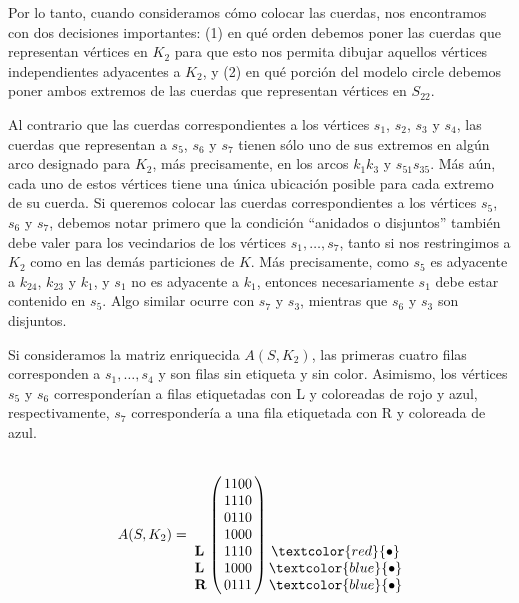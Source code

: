 \documentclass[12pt]{book}
\theoremstyle{plain}
\theoremstyle{remark}
\begin{document}
Por lo tanto, cuando consideramos cómo colocar las cuerdas, nos encontramos con dos de\-ci\-sio\-nes importantes: (1) en qué orden debemos poner las cuerdas que representan vértices en $K_2$ para que esto nos permita dibujar aquellos vértices independientes adyacentes a $K_2$, y (2) en qué porción del modelo circle debemos poner ambos extremos de las cuerdas que representan vértices en $S_{22}$. 

Al contrario que las cuerdas correspondientes a los vértices $s_1$, $s_2$, $s_3$ y $s_4$, las cuerdas que representan a $s_5$, $s_6$ y $s_7$ tienen sólo uno de sus extremos en algún arco designado para $K_2$, más precisamente, en los arcos $k_1 k_3$ y $s_{51} s_{35}$. Más aún, cada uno de estos vértices tiene una única ubicación posible para cada extremo de su cuerda. 
Si queremos colocar las cuerdas co\-rres\-pon\-dien\-tes a los vértices $s_5$, $s_6$ y $s_7$, debemos notar primero que la condición ``anidados o disjuntos'' también debe valer para los vecindarios de los vértices $s_1, \ldots, s_7$, tanto si nos restringimos a $K_2$ como en las demás particiones de $K$. Más precisamente, como $s_5$ es adyacente a $k_{24}$, $k_{23}$ y $k_1$, y $s_1$ no es adyacente a $k_1$, entonces necesariamente $s_1$ debe estar contenido en $s_5$. Algo similar ocurre con $s_7$ y $s_3$, mientras que $s_6$ y $s_3$ son disjuntos. 

Si consideramos la matriz enriquecida $A(S,K_2)$, las primeras cuatro filas corresponden a $s_1, \ldots, s_4$ y son filas sin etiqueta y sin color. Asimismo, los vértices $s_5$ y $s_6$ corresponderían a filas etiquetadas con L y coloreadas de rojo y azul, respectivamente, $s_7$ correspondería a una fila etiquetada con R y coloreada de azul. 

\vspace{-5mm}
\[
A(S,K_2) = 
\bordermatrix{ &  \cr
	& 1 1 0 0 \cr
	& 1 1 1 0 \cr
	& 0 1 1 0 \cr
	& 1 0 0 0 \cr
	\textbf{L} & 1 1 1 0 \cr
	\textbf{L} & 1 0 0 0 \cr
	\textbf{R} & 0 1 1 1 }\,
	\begin{matrix} 
   \cr  \cr \cr  \cr \textcolor{red}{\bullet} \cr \textcolor{blue}{\bullet} \cr \textcolor{blue}{\bullet} 
\end{matrix}
\]
\end{document}
